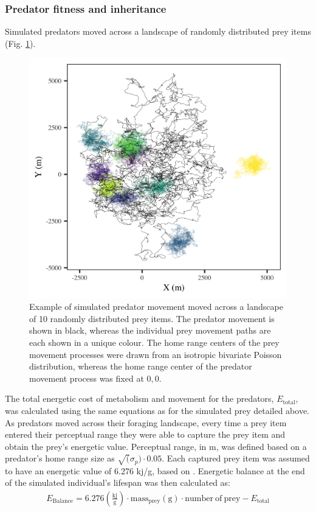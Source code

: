 \documentclass[12pt]{article}
\begin{document}
\subsubsection*{Predator fitness and inheritance}

Simulated predators moved across a landscape of randomly distributed prey items (Fig. \ref{fig:Pred_Example}).

\begin{figure}[!h]
\centering
\includegraphics[scale=1]{Sim_Example.png}
\caption{Example of simulated predator movement moved across a landscape of 10 randomly distributed prey items. The predator movement is shown in black, whereas the individual prey movement paths are each shown in a unique colour. The home range centers of the prey movement processes were drawn from an isotropic bivariate Poisson distribution, whereas the home range center of the predator movement process was fixed at $0,0$.}
\label{fig:Pred_Example}
\end{figure}

The total energetic cost of metabolism and movement for the predators, $E_{\mathrm{total}}$, was calculated using the same equations as for the simulated prey detailed above. As predators moved across their foraging landscape, every time a prey item entered their perceptual range they were able to capture the prey item and obtain the prey's energetic value. Perceptual range, in m, was defined based on a predator's home range size as $\sqrt(\sigma_p)\cdot 0.05$. Each captured prey item was assumed to have an energetic value of 6.276 kj/g, based on \cite{Gorecki:1965}. Energetic balance at the end of the simulated individual's lifespan was then calculated as:
\begin{gather}
E_{\mathrm{Balance}} = 6.276 \mathrm{(\frac{kj}{g})} \cdot \mathrm{mass_{prey} (g) \cdot number~of~prey}  - E_{\mathrm{total}}
\end{gather}
\end{document}
